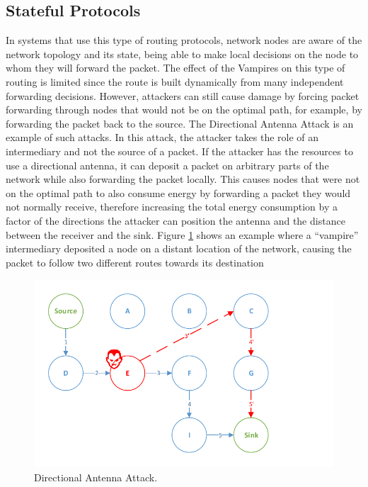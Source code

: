 \documentclass{sig-alternate-05-2015}
\begin{document}
\subsection{Stateful Protocols}
\label{sec:tables_routing}
In systems that use this type of routing protocols, network nodes are aware of the network topology and its state, being able to make local decisions on the node to whom they will forward the packet. The effect of the Vampires on this type of routing is limited since the route is built dynamically from many independent forwarding decisions. However, attackers can still cause damage by forcing packet forwarding through nodes that would not be on the optimal path, for example, by forwarding the packet back to the source. The Directional Antenna Attack is an example of such attacks. In this attack, the attacker takes the role of an intermediary and not the source of a packet. If the attacker has the resources to use a directional antenna, it can deposit a packet on arbitrary parts of the network while also forwarding the packet locally. This causes nodes that were not on the optimal path to also consume energy by forwarding a packet they would not normally receive, therefore increasing the total energy consumption by a factor of the directions the attacker can position the antenna and the distance between the receiver and the sink. Figure \ref{fig:directional_antenna_attack} shows an example where a ``vampire'' intermediary deposited a node on a distant location of the network, causing the packet to follow two different routes towards its destination

\begin{figure}[h]
  \centering
  \includegraphics[width=0.8\linewidth]{figures/Directional_Antenna_Attack.pdf}
  \caption{Directional Antenna Attack.}
  \label{fig:directional_antenna_attack}
\end{figure}
\end{document}
